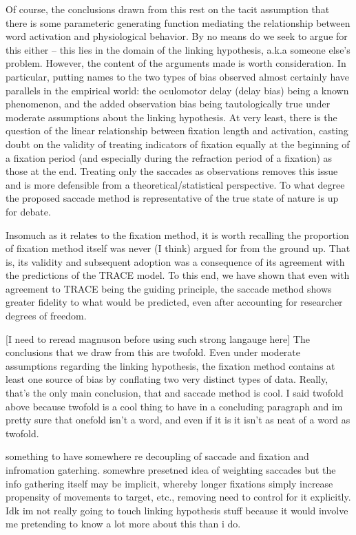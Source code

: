 \documentclass{article}
\begin{document}
Of course, the conclusions drawn from this rest on the tacit assumption that there is some parameteric generating function mediating the relationship between word activation and physiological behavior. By no means do we seek to argue for this either -- this lies in the domain of the linking hypothesis, a.k.a someone else's problem. However, the content of the arguments made is worth consideration. In particular, putting names to the two types of bias observed almost certainly have parallels in the empirical world: the oculomotor delay (delay bias) being a known phenomenon, and the added observation bias being tautologically true under moderate assumptions about the linking hypothesis. At very least, there is the question of the linear relationship between fixation length and activation, casting doubt on the validity of treating indicators of fixation equally at the beginning of a fixation period (and especially during the refraction  period of a fixation) as those at the end. Treating only the saccades as observations removes this issue and is more defensible from a theoretical/statistical perspective. To what degree the proposed saccade method is representative of the true state of nature is up for debate.

Insomuch as it relates to the fixation method, it is worth recalling the proportion of fixation method itself was never (I think) argued for from the ground up. That is, its validity and subsequent adoption was a consequence of its agreement with the predictions of the TRACE model. To this end, we have shown that even with agreement to TRACE being the guiding principle, the saccade method shows greater fidelity to what would be predicted, even after accounting for researcher degrees of freedom.

[I need to reread magnuson before using such strong langauge here]
The conclusions that we draw from this are twofold. Even under moderate assumptions regarding the linking hypothesis, the fixation method contains at least one source of bias by conflating two very distinct types of data. Really, that's the only main conclusion, that and saccade method is cool. I said twofold above because twofold is a cool thing to have in a concluding paragraph and im pretty sure that onefold isn't a word, and even if it is it isn't as neat of a word as twofold.

something to have somewhere re decoupling of saccade and fixation and infromation gaterhing. somewhre presetned idea of weighting saccades but the info gathering itself may be implicit, whereby longer fixations simply increase propensity of movements to target, etc., removing need to control for it explicitly. Idk im not really going to touch linking hypothesis stuff because it would involve me pretending to know a lot more about this than i do.
\end{document}
